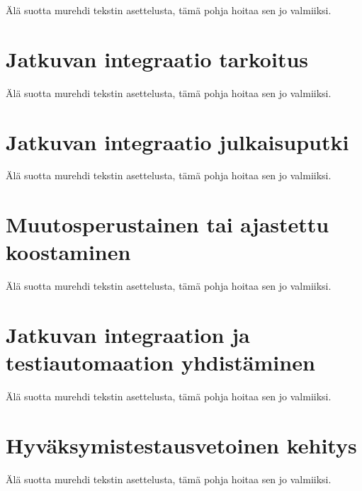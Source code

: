 Älä suotta murehdi tekstin asettelusta, tämä pohja hoitaa sen jo valmiiksi.

\section{Jatkuvan integraatio tarkoitus}

Älä suotta murehdi tekstin asettelusta, tämä pohja hoitaa sen jo valmiiksi.

\section{Jatkuvan integraatio julkaisuputki}

Älä suotta murehdi tekstin asettelusta, tämä pohja hoitaa sen jo valmiiksi.

\section{Muutosperustainen tai ajastettu koostaminen}

Älä suotta murehdi tekstin asettelusta, tämä pohja hoitaa sen jo valmiiksi.

\section{Jatkuvan integraation ja testiautomaation yhdistäminen}

Älä suotta murehdi tekstin asettelusta, tämä pohja hoitaa sen jo valmiiksi.

\section{Hyväksymistestausvetoinen kehitys}

Älä suotta murehdi tekstin asettelusta, tämä pohja hoitaa sen jo valmiiksi.
